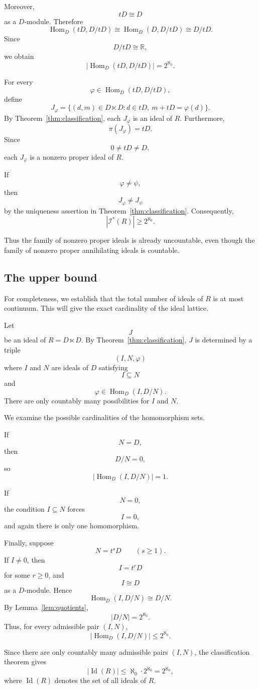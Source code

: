 \documentclass[11pt]{article}
\theoremstyle{definition}
\theoremstyle{remark}
\newcommand{\Hom}{\operatorname{Hom}}
\newcommand{\lt}{\ltimes}
\begin{document}
	Moreover,
	\[
	tD\cong D
	\]
	as a $D$-module. Therefore
	\[
	\Hom_D(tD,D/tD)
	\cong
	\Hom_D(D,D/tD)
	\cong
	D/tD.
	\]
	Since
	\[
	D/tD\cong\mathbb R,
	\]
	we obtain
	\[
	|\Hom_D(tD,D/tD)|
	=
	2^{\aleph_0}.
	\]
	
	For every
	\[
	\varphi\in\Hom_D(tD,D/tD),
	\]
	define
	\[
	J_\varphi
	=
	\{(d,m)\in D\lt D:
	d\in tD,\ m+tD=\varphi(d)\}.
	\]
	By Theorem~\ref{thm:classification}, each $J_\varphi$ is an ideal of
	$R$. Furthermore,
	\[
	\pi(J_\varphi)=tD.
	\]
	Since
	\[
	0\neq tD\neq D,
	\]
	each $J_\varphi$ is a nonzero proper ideal of $R$.
	
	If
	\[
	\varphi\neq\psi,
	\]
	then
	\[
	J_\varphi\neq J_\psi
	\]
	by the uniqueness assertion in Theorem~\ref{thm:classification}.
	Consequently,
	\[
	|\mathcal I^*(R)|
	\geq
	2^{\aleph_0}.
	\]
	
	Thus the family of nonzero proper ideals is already uncountable, even
	though the family of nonzero proper annihilating ideals is countable.
	
	
	\subsection{The upper bound}
	
	For completeness, we establish that the total number of ideals of
	$R$ is at most continuum. This will give the exact cardinality of the
	ideal lattice.
	
	Let
	\[
	J
	\]
	be an ideal of $R=D\lt D$. By Theorem~\ref{thm:classification}, $J$
	is determined by a triple
	\[
	(I,N,\varphi)
	\]
	where $I$ and $N$ are ideals of $D$ satisfying
	\[
	I\subseteq N
	\]
	and
	\[
	\varphi\in\Hom_D(I,D/N).
	\]
	There are only countably many possibilities for $I$ and $N$.
	
	We examine the possible cardinalities of the homomorphism sets.
	
	If
	\[
	N=D,
	\]
	then
	\[
	D/N=0,
	\]
	so
	\[
	|\Hom_D(I,D/N)|=1.
	\]
	
	If
	\[
	N=0,
	\]
	the condition $I\subseteq N$ forces
	\[
	I=0,
	\]
	and again there is only one homomorphism.
	
	Finally, suppose
	\[
	N=t^sD
	\qquad(s\geq1).
	\]
	If $I\neq0$, then
	\[
	I=t^rD
	\]
	for some $r\geq0$, and
	\[
	I\cong D
	\]
	as a $D$-module. Hence
	\[
	\Hom_D(I,D/N)
	\cong
	D/N.
	\]
	By Lemma~\ref{lem:quotients},
	\[
	|D/N|=2^{\aleph_0}.
	\]
	Thus, for every admissible pair $(I,N)$,
	\[
	|\Hom_D(I,D/N)|\leq2^{\aleph_0}.
	\]
	
	Since there are only countably many admissible pairs $(I,N)$, the
	classification theorem gives
	\[
	|\operatorname{Id}(R)|
	\leq
	\aleph_0\cdot2^{\aleph_0}
	=
	2^{\aleph_0},
	\]
	where $\operatorname{Id}(R)$ denotes the set of all ideals of $R$.
	
\end{document}
